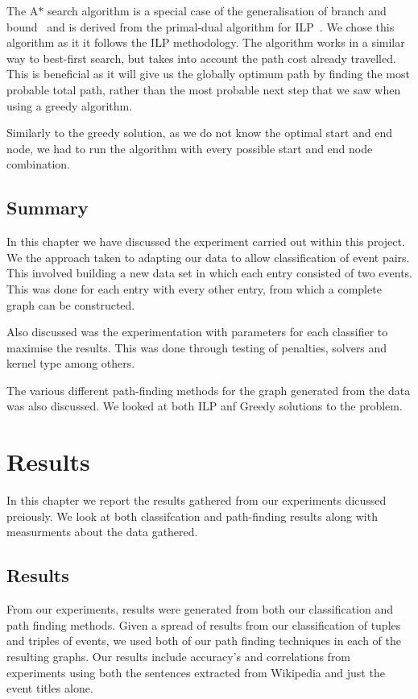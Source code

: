 \documentclass[bsc,frontabs,twoside,singlespacing,parskip,deptreport]{infthesis}     %
\begin{document}
The A$*$ search algorithm is a special case of the generalisation of branch and bound~\cite{balas1983branch} and is derived from the primal-dual algorithm for ILP~\cite{ye2012note}.
We chose this algorithm as it it follows the ILP methodology. The algorithm works in a similar way to best-first search, but takes into account the path cost already travelled.
This is beneficial as it will give us the globally optimum path by finding the most probable total path, rather than the most probable next step that we saw when using a
greedy algorithm.

Similarly to the greedy solution, as we do not know the optimal start and end node, we had to run the algorithm with every possible start and end node combination.


\section{Summary}
In this chapter we have discussed the experiment carried out within this project.
We the approach taken to adapting our data to allow classification of event pairs. This involved building a new data set
in which each entry consisted of two events. This was done for each entry with every other entry, from which a complete
graph can be constructed.

Also discussed was the experimentation with parameters for each classifier to maximise the results. This was done through
testing of penalties, solvers and kernel type among others.

The various different path-finding methods for the graph generated from the data was also discussed.
We looked at both ILP anf Greedy solutions to the problem.

\chapter{Results}
In this chapter we report the results gathered from our experiments dicussed preiously.
We look at both classifcation and path-finding results along with measurments about the data gathered.

\section{Results}
From our experiments, results were generated from both our classification and path finding methods.
Given a spread of results from our classification of tuples and triples of events, we used both of our path finding
techniques in each of the resulting graphs. Our results include accuracy's and correlations from
experiments using both the sentences extracted from Wikipedia and just the event titles alone.   
\end{document}
